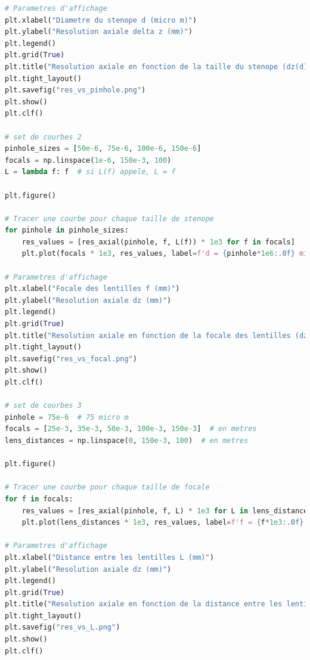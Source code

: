 \documentclass[11pt,letterpaper]{article}
\begin{document}
\begin{lstlisting}[language=python]
# Parametres d'affichage
plt.xlabel("Diametre du stenope d (micro m)")
plt.ylabel("Resolution axiale delta z (mm)")
plt.legend()
plt.grid(True)
plt.title("Resolution axiale en fonction de la taille du stenope (dz(d))")
plt.tight_layout()
plt.savefig("res_vs_pinhole.png")
plt.show()
plt.clf()

# set de courbes 2
pinhole_sizes = [50e-6, 75e-6, 100e-6, 150e-6]
focals = np.linspace(1e-6, 150e-3, 100)
L = lambda f: f  # si L(f) appele, L = f

plt.figure()

# Tracer une courbe pour chaque taille de stenope
for pinhole in pinhole_sizes:
    res_values = [res_axial(pinhole, f, L(f)) * 1e3 for f in focals]
    plt.plot(focals * 1e3, res_values, label=f'd = {pinhole*1e6:.0f} micro m')

# Parametres d'affichage
plt.xlabel("Focale des lentilles f (mm)")
plt.ylabel("Resolution axiale dz (mm)")
plt.legend()
plt.grid(True)
plt.title("Resolution axiale en fonction de la focale des lentilles (dz(f))")
plt.tight_layout()
plt.savefig("res_vs_focal.png")
plt.show()
plt.clf()

# set de courbes 3
pinhole = 75e-6  # 75 micro m
focals = [25e-3, 35e-3, 50e-3, 100e-3, 150e-3]  # en metres
lens_distances = np.linspace(0, 150e-3, 100)  # en metres

plt.figure()

# Tracer une courbe pour chaque taille de focale
for f in focals:
    res_values = [res_axial(pinhole, f, L) * 1e3 for L in lens_distances]
    plt.plot(lens_distances * 1e3, res_values, label=f'f = {f*1e3:.0f} mm')

# Parametres d'affichage
plt.xlabel("Distance entre les lentilles L (mm)")
plt.ylabel("Resolution axiale dz (mm)")
plt.legend()
plt.grid(True)
plt.title("Resolution axiale en fonction de la distance entre les lentilles (dz(L))")
plt.tight_layout()
plt.savefig("res_vs_L.png")
plt.show()
plt.clf()
\end{lstlisting}



\clearpage



\end{document}

